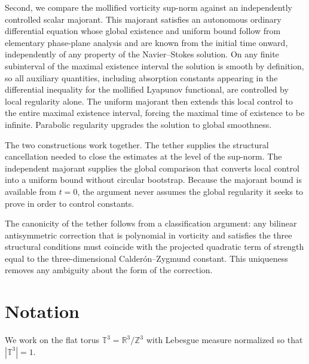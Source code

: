 \documentclass[11pt,a4paper]{article}
\begin{document}
Second, we compare the mollified vorticity sup-norm against an independently controlled scalar majorant. This majorant satisfies an autonomous ordinary differential equation whose global existence and uniform bound follow from elementary phase-plane analysis and are known from the initial time onward, independently of any property of the Navier–Stokes solution. On any finite subinterval of the maximal existence interval the solution is smooth by definition, so all auxiliary quantities, including absorption constants appearing in the differential inequality for the mollified Lyapunov functional, are controlled by local regularity alone. The uniform majorant then extends this local control to the entire maximal existence interval, forcing the maximal time of existence to be infinite. Parabolic regularity upgrades the solution to global smoothness.

The two constructions work together. The tether supplies the structural cancellation needed to close the estimates at the level of the sup-norm. The independent majorant supplies the global comparison that converts local control into a uniform bound without circular bootstrap. Because the majorant bound is available from $t = 0$, the argument never assumes the global regularity it seeks to prove in order to control constants.

The canonicity of the tether follows from a classification argument: any bilinear antisymmetric correction that is polynomial in vorticity and satisfies the three structural conditions must coincide with the projected quadratic term of strength equal to the three-dimensional Calderón–Zygmund constant. This uniqueness removes any ambiguity about the form of the correction.

\section{Notation}

We work on the flat torus $\mathbb{T}^3 = \mathbb{R}^3 / \mathbb{Z}^3$ with Lebesgue measure normalized so that $|\mathbb{T}^3| = 1$.
\end{document}
